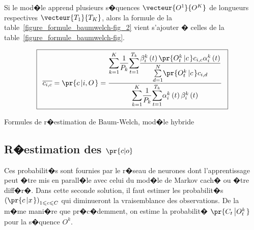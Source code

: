 Si le mod�le apprend plusieurs s�quences $\vecteur{O^1}{O^K}$ de longueurs respectives $\vecteur{T_1}{T_K}$, alors la formule de la table~\ref{figure_formule_baumwelch-fig_2} vient s'ajouter � celles de la table~\ref{figure_formule_baumwelch-fig}.%

                \begin{table}[t]
                \[
                \fbox{$\begin{array}[c]{c}%
                \overline{c_{i,c}}= \pr{  c\left|  i,O\right.  }  =\dfrac{\underset{k=1}
                        {\overset{K}{ {\displaystyle\sum} }}\dfrac{1}{P_{k}}
                \underset{t=1}{\overset{T_{k}}{ {\displaystyle\sum} }}\dfrac{\beta_{i}^{k}
                        \left(  t\right)  \pr{  O_{t}^k\left|  c\right. }
                c_{i,c}\alpha_{i}^{k}\left(  t\right)  }{\underset{d=1}{\overset {N}{\sum}}
                        \pr{ O_{t}^k\left|  c\right.  }  c_{i,d}}}{\underset
                {k=1}{\overset{K}{ {\displaystyle\sum} }}\dfrac{1}{P_{k}}\underset{t=1}
                        {\overset{T_{k}}{ {\displaystyle\sum} }}\alpha_{i}^{k} \left(  t\right)
                \beta_{i}^{k}\left(  t\right)  }\end{array}$}
                \]
                \caption{Formules de r�estimation de Baum-Welch, mod�le hybride}
                \label{figure_formule_baumwelch-fig_2}
                \end{table}






\subsection{R�estimation des $\pr{c |o }$}

%
\label{hmm_reestimation_rn_classification}%

Ces probabilit�s sont fournies par le r�seau de neurones dont l'apprentissage peut �tre mis en parall�le avec celui du mod�le de Markov cach� ou �tre diff�r�. Dans cette seconde solution, il faut estimer les probabilit�s $\left( \pr{ c\left| x\right. } \right) _{1\leqslant c\leqslant C}$ qui diminueront la vraisemblance des observations. De la m�me mani�re que pr�c�demment, on estime la probabilit� $\pr{C_{t}\left| O_{t}^{k}\right. }  $ pour la s�quence $O^{k}$. 


